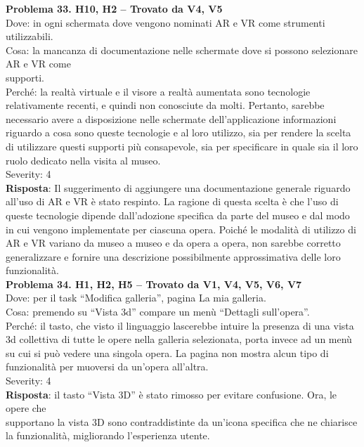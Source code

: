 \documentclass{article}
\begin{document}
\noindent \textbf{Problema 33. H10, H2 – Trovato da V4, V5} \\
Dove: in ogni schermata dove vengono nominati AR e VR come strumenti utilizzabili. \\
Cosa: la mancanza di documentazione nelle schermate dove si possono selezionare AR e VR come \\supporti. \\
Perché: la realtà virtuale e il visore a realtà aumentata sono tecnologie relativamente recenti, e quindi non conosciute da molti. Pertanto, sarebbe necessario avere a disposizione nelle schermate dell’applicazione informazioni riguardo a cosa sono queste tecnologie e al loro utilizzo, sia per rendere la scelta di utilizzare questi supporti più consapevole, sia per specificare in quale sia il loro ruolo dedicato nella visita al museo. \\
Severity: 4 \\
\textbf{Risposta}: Il suggerimento di aggiungere una documentazione generale riguardo all'uso di AR e VR è stato respinto. La ragione di questa scelta è che l'uso di queste tecnologie dipende dall'adozione specifica da parte del museo e dal modo in cui vengono implementate per ciascuna opera. Poiché le modalità di utilizzo di AR e VR variano da museo a museo e da opera a opera, non sarebbe corretto generalizzare e fornire una descrizione possibilmente approssimativa delle loro funzionalità. \\

\noindent \textbf{Problema 34. H1, H2, H5 – Trovato da V1, V4, V5, V6, V7} \\
Dove: per il task “Modifica galleria”, pagina La mia galleria. \\
Cosa: premendo su “Vista 3d” compare un menù “Dettagli sull’opera”. \\
Perché: il tasto, che visto il linguaggio lascerebbe intuire la presenza di una vista 3d collettiva di tutte le opere nella galleria selezionata, porta invece ad un menù su cui si può vedere una singola opera. La pagina non mostra alcun tipo di funzionalità per muoversi da un’opera all’altra. \\
Severity: 4 \\
\textbf{Risposta}: il tasto “Vista 3D” è stato rimosso per evitare confusione. Ora, le opere che \\ supportano la vista 3D sono contraddistinte da un’icona specifica che ne chiarisce la funzionalità, migliorando l’esperienza utente.\\
\end{document}
